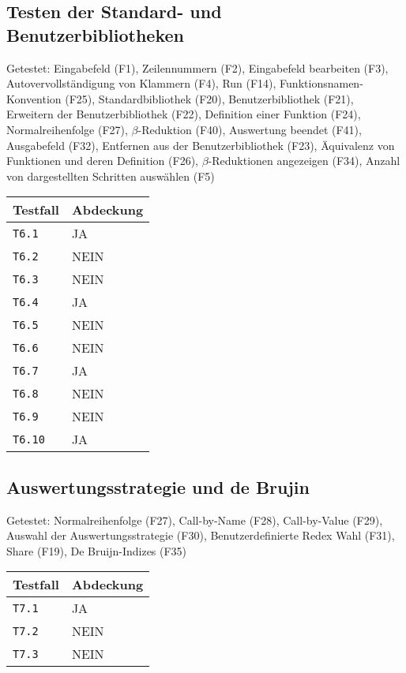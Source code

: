 \documentclass[parskip=full,11pt,twoside]{scrartcl}
\newcommand{\testline}[2]{
    \texttt{#1} & \ifthenelse{\equal{#2}{JA}}{\cellcolor{green!20}}{\cellcolor{red!20}}#2 \\ \hline
}
\begin{document}
\subsection{Testen der Standard- und Benutzerbibliotheken}
    Getestet:
    Eingabefeld (F1),
    Zeilennummern (F2),
    Eingabefeld bearbeiten (F3),
    Autovervollständigung von Klammern (F4),
    Run (F14),
    Funktionsnamen-Konvention (F25),
    Standardbibliothek (F20),
    Benutzerbibliothek (F21),
    Erweitern der Benutzerbibliothek (F22),
    Definition einer Funktion (F24),
    Normalreihenfolge (F27),
    $\beta$-Reduktion (F40),
    Auswertung beendet (F41),
    Ausgabefeld (F32),
    Entfernen aus der Benutzerbibliothek (F23),
    Äquivalenz von Funktionen und deren Definition (F26),
    $\beta$-Reduktionen angezeigen (F34),
    Anzahl von dargestellten Schritten auswählen (F5)

    \label{shortcuts}
    \begin{center}
        \begin{tabular}{ p{9cm} p{4cm}}
            Testfall & Abdeckung \\ \hline
            \testline{T6.1}{JA}
            \testline{T6.2}{NEIN}
            \testline{T6.3}{NEIN}
            \testline{T6.4}{JA}
            \testline{T6.5}{NEIN}
            \testline{T6.6}{NEIN}
            \testline{T6.7}{JA}
            \testline{T6.8}{NEIN}
            \testline{T6.9}{NEIN}
            \testline{T6.10}{JA}
        \end{tabular}
    \end{center}

\subsection{Auswertungsstrategie und de Brujin}
    Getestet:
    Normalreihenfolge (F27),
    Call-by-Name (F28),
    Call-by-Value (F29),
    Auswahl der Auswertungsstrategie (F30),
    Benutzerdefinierte Redex Wahl (F31),
    Share (F19),
    De Bruijn-Indizes (F35)

    \label{shortcuts}
    \begin{center}
        \begin{tabular}{ p{9cm} p{4cm}}
            Testfall & Abdeckung \\ \hline
            \testline{T7.1}{JA}
            \testline{T7.2}{NEIN}
            \testline{T7.3}{NEIN}
        \end{tabular}
    \end{center}
\end{document}
